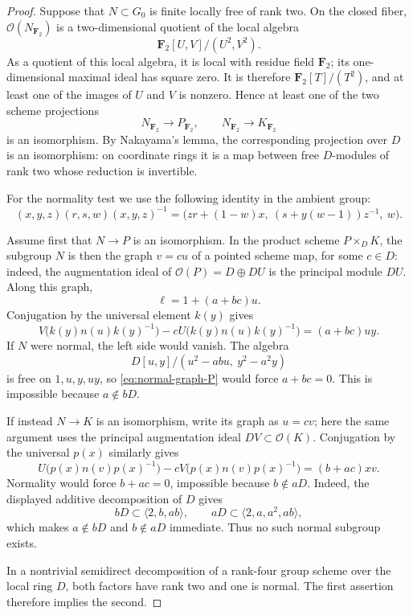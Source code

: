 \documentclass[11pt]{amsart}
\theoremstyle{remark}
\newcommand{\F}{\mathbf F}
\begin{document}
\begin{proof}
Suppose that \(N\subset G_0\) is finite locally free of rank two.  On
the closed fiber, \(\mathcal O(N_{\F_2})\) is a two-dimensional quotient
of the local algebra
\[
 \F_2[U,V]/(U^2,V^2).
\]
As a quotient of this local algebra, it is local with residue field
\(\F_2\); its one-dimensional maximal ideal has square zero.  It is
therefore \(\F_2[T]/(T^2)\), and at least one of the images of \(U\) and
\(V\) is nonzero.  Hence at least one of the two scheme projections
\[
 N_{\F_2}\longrightarrow P_{\F_2},
 \qquad
 N_{\F_2}\longrightarrow K_{\F_2}
\]
is an isomorphism.  By Nakayama's lemma, the corresponding projection
over \(D\) is an isomorphism: on coordinate rings it is a map between
free \(D\)-modules of rank two whose reduction is invertible.

For the normality test we use the following identity in the ambient
group:
\begin{equation}\label{eq:ambient-conjugation}
 (x,y,z)(r,s,w)(x,y,z)^{-1}
 =
 \bigl(zr+(1-w)x,\ (s+y(w-1))z^{-1},\ w\bigr).
\end{equation}

Assume first that \(N\to P\) is an isomorphism.  In the product scheme
\(P\times_DK\), the subgroup \(N\) is then the graph
\(v=cu\) of a pointed scheme map, for some \(c\in D\): indeed, the
augmentation ideal of \(\mathcal O(P)=D\oplus DU\) is the principal
module \(DU\).  Along this graph,
\[
 \ell=1+(a+bc)u.
\]
Conjugation by the universal element \(k(y)\) gives
\begin{equation}\label{eq:normal-graph-P}
 V\bigl(k(y)n(u)k(y)^{-1}\bigr)
 -cU\bigl(k(y)n(u)k(y)^{-1}\bigr)
 =(a+bc)uy.
\end{equation}
If \(N\) were normal, the left side would vanish.  The algebra
\[
 D[u,y]/(u^2-abu,\ y^2-a^2y)
\]
is free on \(1,u,y,uy\), so \eqref{eq:normal-graph-P} would force
\(a+bc=0\).  This is impossible because \(a\notin bD\).

If instead \(N\to K\) is an isomorphism, write its graph as
\(u=cv\); here the same argument uses the principal augmentation ideal
\(DV\subset\mathcal O(K)\).  Conjugation by the universal \(p(x)\)
similarly gives
\begin{equation}\label{eq:normal-graph-K}
 U\bigl(p(x)n(v)p(x)^{-1}\bigr)
 -cV\bigl(p(x)n(v)p(x)^{-1}\bigr)
 =(b+ac)xv.
\end{equation}
Normality would force \(b+ac=0\), impossible because
\(b\notin aD\).  Indeed, the displayed additive decomposition of \(D\)
gives
\[
 bD\subset\langle2,b,ab\rangle,
 \qquad
 aD\subset\langle2,a,a^2,ab\rangle,
\]
which makes \(a\notin bD\) and \(b\notin aD\) immediate.  Thus no such
normal subgroup exists.

In a nontrivial semidirect decomposition of a rank-four group scheme
over the local ring \(D\), both factors have rank two and one is normal.
The first assertion therefore implies the second.
\end{proof}
\end{document}
